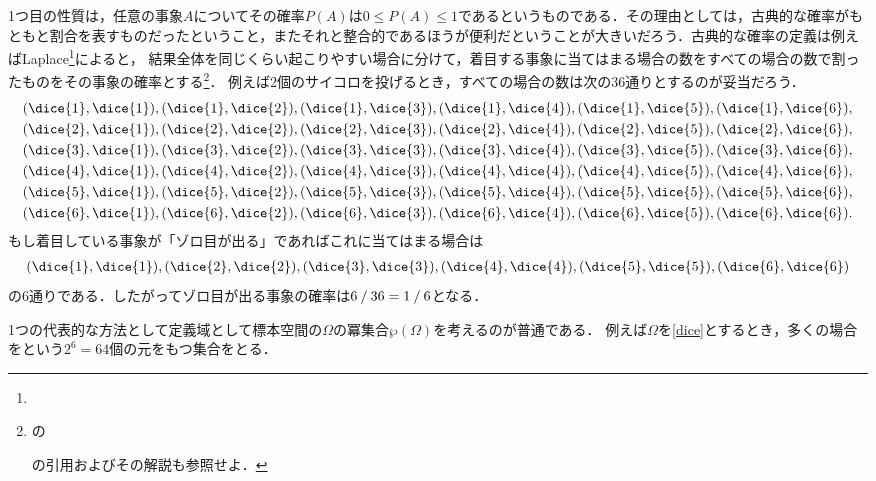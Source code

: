 \documentclass[main.tex]{subfiles}
\begin{document}
1つ目の性質は，任意の事象\(A\)についてその確率\(P(A)\)は\(0 \leq P(A) \leq 1\)であるというものである．その理由としては，古典的な確率がもともと割合を表すものだったということ，またそれと整合的であるほうが便利だということが大きいだろう．古典的な確率の定義は例えばLaplace\footnote{%
}によると，
結果全体を同じくらい起こりやすい場合に分けて，着目する事象に当てはまる場合の数をすべての場合の数で割ったものをその事象の確率とする\footnote{%
の\begin{french}\end{french}の引用およびその解説も参照せよ．}．
例えば2個のサイコロを投げるとき，すべての場合の数は次の36通りとするのが妥当だろう．
\begin{align*}
    & (\dice{1}, \dice{1}), (\dice{1}, \dice{2}), (\dice{1}, \dice{3}), (\dice{1}, \dice{4}), (\dice{1}, \dice{5}), (\dice{1}, \dice{6}), \\
    & (\dice{2}, \dice{1}), (\dice{2}, \dice{2}), (\dice{2}, \dice{3}), (\dice{2}, \dice{4}), (\dice{2}, \dice{5}), (\dice{2}, \dice{6}), \\
    & (\dice{3}, \dice{1}), (\dice{3}, \dice{2}), (\dice{3}, \dice{3}), (\dice{3}, \dice{4}), (\dice{3}, \dice{5}), (\dice{3}, \dice{6}), \\
    & (\dice{4}, \dice{1}), (\dice{4}, \dice{2}), (\dice{4}, \dice{3}), (\dice{4}, \dice{4}), (\dice{4}, \dice{5}), (\dice{4}, \dice{6}), \\
    & (\dice{5}, \dice{1}), (\dice{5}, \dice{2}), (\dice{5}, \dice{3}), (\dice{5}, \dice{4}), (\dice{5}, \dice{5}), (\dice{5}, \dice{6}), \\
    & (\dice{6}, \dice{1}), (\dice{6}, \dice{2}), (\dice{6}, \dice{3}), (\dice{6}, \dice{4}), (\dice{6}, \dice{5}), (\dice{6}, \dice{6}).
\end{align*}
もし着目している事象が「ゾロ目が出る」であればこれに当てはまる場合は
\begin{align*}
    (\dice{1}, \dice{1}), (\dice{2}, \dice{2}), (\dice{3}, \dice{3}), (\dice{4}, \dice{4}), (\dice{5}, \dice{5}), (\dice{6}, \dice{6})
\end{align*}
の6通りである．したがってゾロ目が出る事象の確率は\(6\mathbin{/}36 = 1\mathbin{/}6\)となる．



1つの代表的な方法として定義域として標本空間の\(\Omega\)の冪集合\(\wp(\Omega)\)を考えるのが普通である．
例えば\(\Omega\)を\eqref{dice}とするとき，多くの場合
をという\(2^6 = 64\)個の元をもつ集合をとる．
\end{document}
